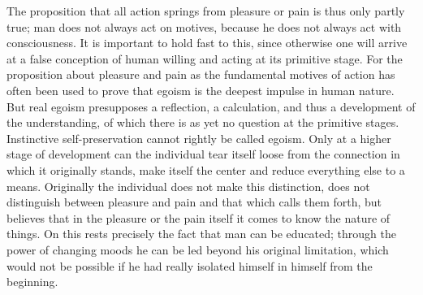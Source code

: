 \documentclass[12pt,a4paper,openany]{book}
\newcommand{\opage}[1]{\marginnote{\footnotesize\textit{[#1]}}}
\begin{document}
The proposition that all action springs from pleasure or pain is thus only
partly true; man does not always act on motives, because he does not always
act with consciousness. It is important to hold fast to this, since
otherwise one will arrive at a false conception of human willing and acting
at its primitive stage. For the proposition about pleasure and pain as the
fundamental motives of action has often been used to prove that egoism is
the deepest impulse in human nature. But real egoism presupposes a
reflection, a calculation, and thus a development of the understanding, of
which there is as yet no question at the primitive stages. Instinctive
self-preservation cannot rightly be called egoism. Only at a higher stage
of development can the individual tear itself loose from the connection in
which it originally stands, make itself the center and reduce everything
else to a means. Originally the individual does not make this distinction,
does not distinguish between pleasure and pain and that which calls them
forth, but believes that in the pleasure or the pain itself it comes to
know the nature of things. On this rests precisely the fact that man can be
educated; through the power of changing moods he can be led beyond his
\opage{13}original limitation, which would not be possible if he had really
isolated himself in himself from the beginning.
\end{document}
